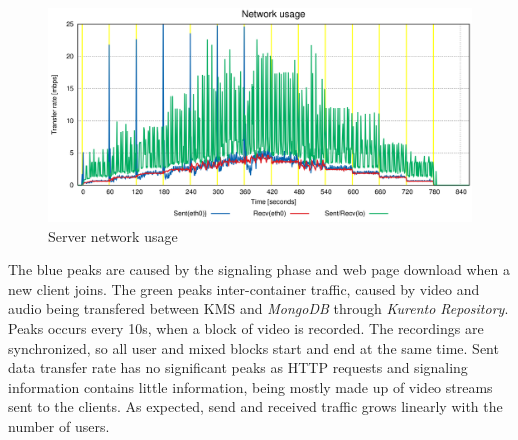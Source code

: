 \documentclass[10pt,conference]{IEEEtran}
\begin{document}
\begin{figure}
  \centering
\includegraphics[width=\linewidth]{net_usage.png}
  \caption{Server network usage}
  \label{fig:test_full_features_net}
\end{figure}


The blue peaks are caused by the signaling phase and web page download when a new client joins.
The green peaks inter-container traffic, caused by video and audio being transfered between \gls{KMS} and \emph{MongoDB} through \emph{Kurento Repository}.
Peaks occurs every 10s, when a block of video is recorded.
The recordings are synchronized, so all user and mixed blocks start and end at the same time.
Sent data transfer rate has no significant peaks as \gls{HTTP} requests and signaling information contains little information, being mostly made up of video streams sent to the clients.
As expected, send and received traffic grows linearly with the number of users.

\end{document}
